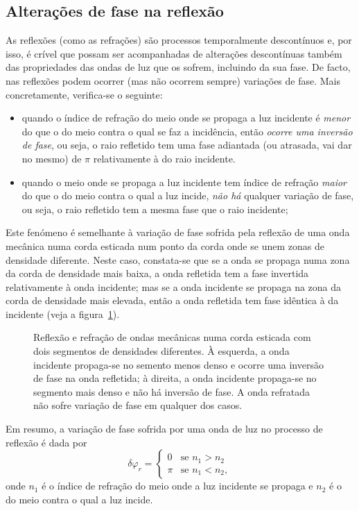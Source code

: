 \subsection*{Alterações de fase na reflexão}
As reflexões (como as refrações) são processos temporalmente descontínuos e,
por isso, é crível que possam ser acompanhadas de alterações descontínuas também
das propriedades das ondas de luz que os sofrem, incluindo da sua fase. De
facto, nas reflexões podem ocorrer (mas não ocorrem sempre) variações de fase.
Mais concretamente, verifica-se o seguinte:
\begin{itemize}
\item
    quando o índice de refração do meio onde se propaga a luz incidente é
    \emph{menor} do que o do meio contra o qual se faz a incidência, então
    \emph{ocorre uma inversão de fase}, ou seja, o raio refletido tem uma fase
    adiantada (ou atrasada, vai dar no mesmo) de $\pi$ relativamente à do raio
    incidente.
\item
    quando o meio onde se propaga a luz incidente tem índice de refração
    \emph{maior} do que o do meio contra o qual a luz incide, \emph{não há}
    qualquer variação de fase, ou seja, o raio refletido tem a mesma fase que o
    raio incidente;
\end{itemize}

Este fenómeno é semelhante à variação de fase sofrida pela reflexão de uma onda
mecânica numa corda esticada num ponto da corda onde se unem zonas de densidade
diferente. Neste caso, constata-se que se a onda se propaga numa zona da corda
de densidade mais baixa, a onda refletida tem a fase invertida relativamente à
onda incidente; mas se a onda incidente se propaga na zona da corda de densidade
mais elevada, então a onda refletida tem fase idêntica à da incidente (veja a
figura~\ref{fig:oof090}).
\begin{figure}[htb]
{\centering
\caption{Reflexão e refração de ondas mecânicas numa corda esticada com dois
segmentos de densidades diferentes. À esquerda, a onda incidente propaga-se no
semento menos denso e ocorre uma inversão de fase na onda refletida; à direita,
a onda incidente propaga-se no segmento mais denso e não há inversão de fase. A
onda refratada não sofre variação de fase em qualquer dos
casos.\label{fig:oof090}}

}
\end{figure}

Em resumo, a variação de fase sofrida por uma onda de luz no processo de
reflexão é dada por
\begin{equation*}
\delta\varphi_r = 
\begin{cases}
    0&\text{se } n_1>n_2\\
    \pi&\text{se } n_1<n_2,
\end{cases}
\end{equation*}
onde $n_1$ é o índice de refração do meio onde a luz incidente se propaga e
$n_2$ é o do meio contra o qual a luz incide.


